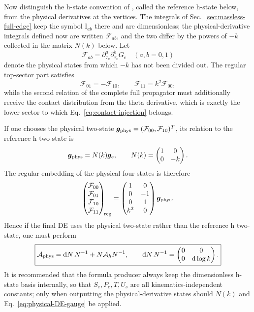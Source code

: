 \documentclass[11pt,a4paper]{article}
\newcommand{\dd}{\mathrm d}
\begin{document}
Now distinguish the h-state convention of \cite{Chen:2023eic}, called the reference h-state below, from the physical derivatives at the vertices. The integrals of Sec.~\ref{sec:massless-full-edge} keep the symbol $\text{I}_{ab}$ there and are dimensionless; the physical-derivative integrals defined now are written $\mathcal F_{ab}$, and the two differ by the powers of $-k$ collected in the matrix $N(k)$ below. Let
\begin{equation}
 \mathcal F_{ab}
 =\partial_{\tau_u}^{a}\partial_{\tau_v}^{b}G_e
 \quad(a,b=0,1)
\end{equation}
denote the physical states from which $-k$ has not been divided out. The regular top-sector part satisfies
\begin{equation}
 \mathcal F_{01}=-\mathcal F_{10},
 \qquad
 \mathcal F_{11}=k^2\mathcal F_{00},
 \label{eq:physical-massless-relations}
\end{equation}
while the second relation of the complete full propagator must additionally receive the contact distribution from the theta derivative, which is exactly the lower sector to which Eq.~\eqref{eq:contact-injection} belongs.

If one chooses the physical two-state $\bm g_{\rm phys}=(\mathcal F_{00},\mathcal F_{10})^T$, its relation to the reference h two-state is
\begin{equation}
 \bm g_{\rm phys}=N(k)\bm g_e,
 \qquad
 N(k)=\begin{pmatrix}1&0\\0&-k\end{pmatrix}.
 \label{eq:physical-basis-N}
\end{equation}
The regular embedding of the physical four states is therefore
\begin{equation}
 \begin{pmatrix}
 \mathcal F_{00}\\\mathcal F_{01}\\\mathcal F_{10}\\\mathcal F_{11}
 \end{pmatrix}_{\!\rm reg}
 =
 \begin{pmatrix}
 1&0\\
 0&-1\\
 0&1\\
 k^2&0
 \end{pmatrix}
 \bm g_{\rm phys}.
 \label{eq:physical-four-to-two}
\end{equation}
Hence if the final DE uses the physical two-state rather than the reference h two-state, one must perform
\begin{equation}
 \boxed{
 \mathcal A_{\rm phys}
 =\dd N\,N^{-1}+N\mathcal A_hN^{-1},
 \qquad
 \dd N\,N^{-1}
 =\begin{pmatrix}0&0\\0&\dd\log k\end{pmatrix}.
 }
 \label{eq:physical-DE-gauge}
\end{equation}
It is recommended that the formula producer always keep the dimensionless h-state basis internally, so that $S_e,P_e,T,U_s$ are all kinematics-independent constants; only when outputting the physical-derivative states should $N(k)$ and Eq.~\eqref{eq:physical-DE-gauge} be applied.
\end{document}
